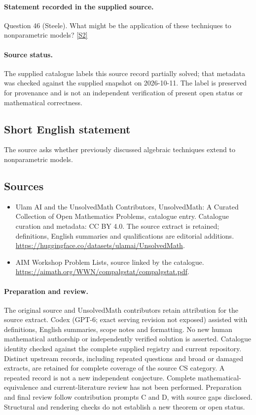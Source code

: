 \documentclass[11pt]{article}
\begin{document}
\paragraph{Statement recorded in the supplied source.}
Question 46 (Steele). What might be the application of these techniques to nonparametric models? \href{https://aimath.org/WWN/compalgstat/compalgstat.pdf}{[S2]}
\paragraph{Source status.}
The supplied catalogue labels this source record partially solved; that metadata was checked against the supplied snapshot on 2026-10-11. The label is preserved for provenance and is not an independent verification of present open status or mathematical correctness.
\subsection{Short English statement}
The source asks whether previously discussed algebraic techniques extend to nonparametric models.
\subsection{Sources}
\begin{itemize}
\item[S1] Ulam AI and the UnsolvedMath Contributors, UnsolvedMath: A Curated Collection of Open Mathematics Problems, catalogue entry. Catalogue curation and metadata: CC BY 4.0. The source extract is retained; definitions, English summaries and qualifications are editorial additions.
\url{https://huggingface.co/datasets/ulamai/UnsolvedMath}.
\item[S2] AIM Workshop Problem Lists, source linked by the catalogue.
\url{https://aimath.org/WWN/compalgstat/compalgstat.pdf}.
\end{itemize}
\paragraph{Preparation and review.}
The original source and UnsolvedMath contributors retain attribution for the source extract. Codex (GPT-6; exact serving revision not exposed) assisted with definitions, English summaries, scope notes and formatting. No new human mathematical authorship or independently verified solution is asserted. Catalogue identity checked against the complete supplied registry and current repository. Distinct upstream records, including repeated questions and broad or damaged extracts, are retained for complete coverage of the source CS category. A repeated record is not a new independent conjecture. Complete mathematical-equivalence and current-literature review has not been performed. Preparation and final review follow contribution prompts C and D, with source gaps disclosed. Structural and rendering checks do not establish a new theorem or open status.
\label{end:statement}
\end{document}
